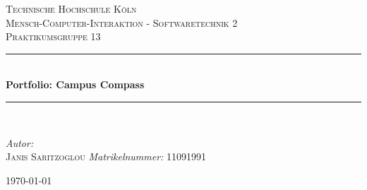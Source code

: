 \begin{titlepage}
\begin{center}

\textsc{\LARGE Technische Hochschule Köln}\\[1.5cm] %
\textsc{\Large Mensch-Computer-Interaktion - Softwaretechnik 2}\\[0.5cm] %
\textsc{\large Praktikumsgruppe 13}\\[0.5cm] %

\newcommand{\HRule}{\rule{\linewidth}{0.5mm}}
\HRule \\[0.4cm]
{ \huge \bfseries Portfolio: Campus Compass}\\[0.4cm]
\HRule \\[1.5cm]
\begin{minipage}{0.3\textwidth}
\begin{flushleft} \large
\emph{Autor:}\\
\textsc{Janis Saritzoglou}
\emph{Matrikelnummer:}
\textsc{11091991}
\end{flushleft}
\end{minipage}
\hfill

\vfill
{\large \today}
\end{center}
\end{titlepage}